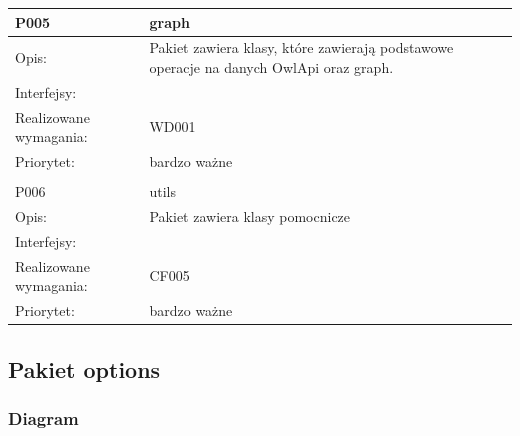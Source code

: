\begin{center}
\begin{longtable}{|m{3cm}|m{9cm}|}
P005 & graph\\ \hline
Opis: & Pakiet zawiera klasy, które zawierają podstawowe operacje na danych OwlApi oraz graph. \\ \hline
Interfejsy: &     \\ \hline
Realizowane wymagania: & WD001 \\ \hline
Priorytet: & bardzo ważne \\ \hline

\multicolumn{2}{c}{} \\
 \hline

P006 & utils\\ \hline
Opis: & Pakiet zawiera klasy pomocnicze \\ \hline
Interfejsy: &     \\ \hline
Realizowane wymagania: & CF005 \\ \hline
Priorytet: & bardzo ważne \\ \hline

\end{longtable}

\end{center}

\subsection{Pakiet options}

\subsubsection{Diagram}


